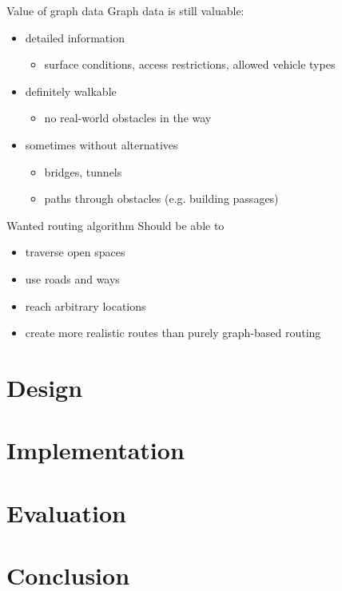 \documentclass{beamer}
\begin{document}
		\begin{frame}{Value of graph data}
			Graph data is still valuable:\n
			\begin{itemize}
				\item detailed information
				\begin{itemize}
					\item surface conditions, access restrictions, allowed vehicle types
				\end{itemize}
				\item definitely walkable
				\begin{itemize}
					\item no real-world obstacles in the way
				\end{itemize}
				\item sometimes without alternatives
				\begin{itemize}
					\item bridges, tunnels
					\item paths through obstacles (e.g. building passages)
				\end{itemize}
			\end{itemize}
		\end{frame}
		
		\begin{frame}{Wanted routing algorithm}
			Should be able to\n
			\begin{itemize}
				\item traverse open spaces
				\item use roads and ways
				\item reach arbitrary locations
				\item create more realistic routes than purely graph-based routing
			\end{itemize}
		\end{frame}
	
	\section{Design}
	
	\section{Implementation}
	
	\section{Evaluation}
	
	\section{Conclusion}
\end{document}
